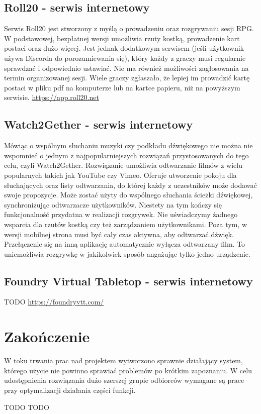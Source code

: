 \documentclass[shortabstract,inz]{iithesis}
\begin{document}
		\section{Roll20 - serwis internetowy}
		Serwis Roll20 jest stworzony z myślą o prowadzeniu oraz rozgrywaniu sesji RPG. W podstawowej, bezpłatnej wersji umożliwia rzuty kostką, prowadzenie kart postaci oraz dużo więcej. Jest jednak dodatkowym serwisem (jeśli użytkownik używa Discorda do porozumiewania się), który każdy z graczy musi regularnie sprawdzać i odpowiednio ustawiać. Nie ma również możliwości zagłosowania na termin organizowanej sesji. Wiele graczy zgłaszało, że lepiej im prowadzić kartę postaci w pliku pdf na komputerze lub na kartce papieru, niż na powyższym serwisie. \url{https://app.roll20.net}
		\section{Watch2Gether - serwis internetowy}
		Mówiąc o wspólnym słuchaniu muzyki czy podkładu dźwiękowego nie można nie wspomnieć o jednym z najpopularniejszych rozwiązań przystosowanych do tego celu, czyli Watch2Gether. Rozwiązanie umożliwia odtwarzanie filmów z wielu popularnych takich jak YouTube czy Vimeo. Oferuje utworzenie pokoju dla słuchających oraz listy odtwarzania, do której każdy z uczestników może dodawać swoje propozycje. Może zostać użyty do wspólnego słuchania ścieżki dźwiękowej, synchronizując odtwarzacze użytkowników. Niestety na tym kończy się funkcjonalność przydatna w realizacji rozgrywek. Nie uświadczymy żadnego wsparcia dla rzutów kostką czy też zarządzaniem użytkownikami. Poza tym, w wersji mobilnej strona musi być cały czas aktywna, aby odtwarzać dźwięk. Przełączenie się na inną aplikację automatycznie wyłącza odtwarzany film. To uniemożliwia rozgrywkę w jakikolwiek sposób angażując tylko jedno urządzenie. 
		\section{Foundry Virtual Tabletop - serwis internetowy}
		TODO \url{https://foundryvtt.com/}
		
		
	\chapter{Zakończenie}
	
	 W toku trwania prac nad projektem wytworzono sprawnie działający system, którego użycie nie powinno sprawiać problemów po krótkim zapoznaniu. W celu udostępnienia rozwiązania dużo szerszej grupie odbiorców wymagane są prace przy optymalizacji działania części funkcji.
	 
	 TODO TODO
	
	\printbibliography[title=Bibliografia]
\end{document}
